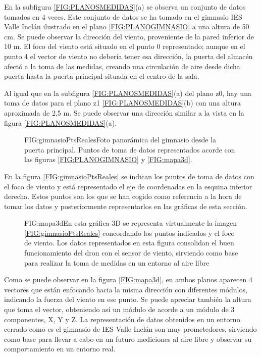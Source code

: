 En la subfigura \ref{FIG:PLANOSMEDIDAS}(a) se observa un conjunto de datos tomados en 4 veces. Este conjunto de datos se ha tomado en el gimnasio IES Valle Inclán ilustrado en el plano \ref{FIG:PLANOGIMNASIO} a una altura de 50 cm. Se puede observar la dirección del viento, proveniente de la pared inferior de 10 m. El foco del viento está situado en el punto 0 representado; aunque en el punto 4 el vector de viento no debería tener esa dirección, la puerta del almacén afectó a la toma de las medidas, creando una circulación de aire desde dicha puerta hasta la puerta principal situada en el centro de la sala.

Al igual que en la subfigura \ref{FIG:PLANOSMEDIDAS}(a) del plano z0, hay una toma de datos para el plano z1 \ref{FIG:PLANOSMEDIDAS}(b) con una altura aproximada de 2,5 m. Se puede observar una dirección similar a la vista en la figura \ref{FIG:PLANOSMEDIDAS}(a).


\begin{figure}[Representación toma de puntos en gimnasio]{FIG:gimnasioPtsReales}{Foto panorámica del gimnasio desde la puerta principal. Puntos de toma de datos representados acorde con las figuras \ref{FIG:PLANOGIMNASIO} y \ref{FIG:mapa3d}.}
\end{figure}
En la figura \ref{FIG:gimnasioPtsReales} se indican los puntos de toma de datos con el foco de viento y está representado el eje de coordenadas en la esquina inferior derecha. Estos puntos son los que se han cogido como referencia a la hora de tomar los datos y posteriormente representarlos en las gráficas de esta sección.

\begin{figure}[Mapa de viento 3D]{FIG:mapa3d}{En esta gráfica 3D se representa virtualmente la imagen \ref{FIG:gimnasioPtsReales} concordando los puntos indicados y el foco de viento. Los datos representados en esta figura consolidan el buen funcionamiento del dron con el sensor de viento, sirviendo como base para realizar la toma de medidas en un entorno al aire libre}
\end{figure}
Como se puede observar en la figura \ref{FIG:mapa3d}, en ambos planos aparecen 4 vectores que están enfocando hacia la misma dirección con diferentes módulos, indicando la fuerza del viento en ese punto. Se puede apreciar también la altura que toma el vector, obteniendo así un módulo de acorde a un módulo de 3 componentes, X, Y y Z. La representación de datos obtenidos en un entorno cerrado como es el gimnasio de IES Valle Inclán son muy prometedores, sirviendo como base para llevar a cabo en un futuro mediciones al aire libre y observar su comportamiento en un entorno real.
